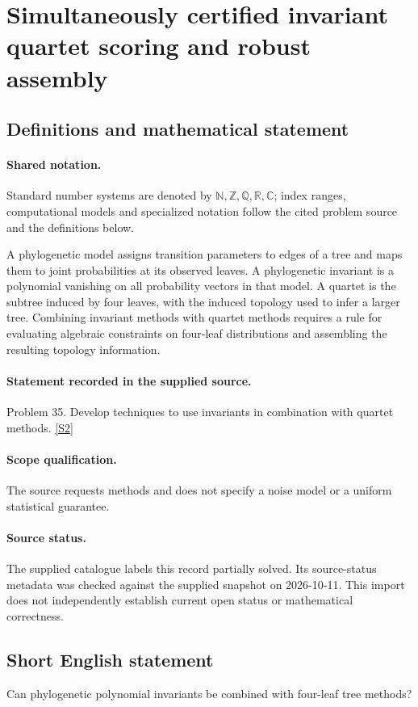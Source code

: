 \documentclass[11pt]{article}
\newcommand{\sref}[2]{\hyperlink{source:#1:#2}{[S#2]}}
\begin{document}
\section{Simultaneously certified invariant quartet scoring and robust assembly}\label{statement}

\subsection{Definitions and mathematical statement}

\paragraph{Shared notation.}Standard number systems are denoted by $\mathbb N,\mathbb Z,\mathbb Q,\mathbb R,\mathbb C$; index ranges, computational models and specialized notation follow the cited problem source and the definitions below.


A phylogenetic model assigns transition parameters to edges of a tree and maps them to joint probabilities at its observed leaves. A phylogenetic invariant is a polynomial vanishing on all probability vectors in that model. A quartet is the subtree induced by four leaves, with the induced topology used to infer a larger tree. Combining invariant methods with quartet methods requires a rule for evaluating algebraic constraints on four-leaf distributions and assembling the resulting topology information.
\paragraph{Statement recorded in the supplied source.}
Problem 35. Develop techniques to use invariants in combination with quartet methods. \sref{statement}{2}
\paragraph{Scope qualification.}
The source requests methods and does not specify a noise model or a uniform statistical guarantee.
\paragraph{Source status.}
The supplied catalogue labels this record partially solved. Its source-status metadata was checked against the supplied snapshot on 2026-10-11. This import does not independently establish current open status or mathematical correctness.
\subsection{Short English statement}
Can phylogenetic polynomial invariants be combined with four-leaf tree methods?
\end{document}
